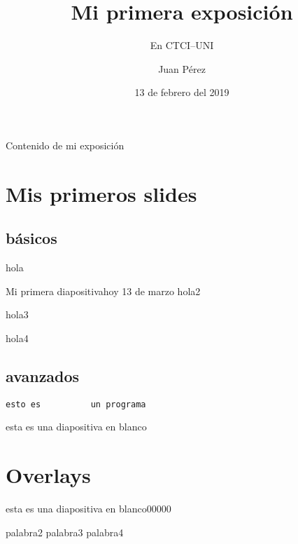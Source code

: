 \documentclass[utf8,spanish,xcolor={svgnames},14pt,handout]{beamer}
\title{Mi primera exposición}
\subtitle{En CTCI--UNI}
\author{Juan Pérez}
\institute[UNI]{UNIVERSIDAD NACIONAL DE INGENIERÍA}
\date{13 de febrero del 2019}
\begin{document}
\maketitle

\begin{frame}{Contenido de mi exposición}\transblindsvertical
\tableofcontents
\end{frame}

\section{Mis primeros slides}
\subsection{básicos}
\begin{frame}\transsplithorizontalout
hola
\end{frame}

\begin{frame}{Mi primera diapositiva}{hoy 13 de marzo}\transsplithorizontalout
hola2
\end{frame}

\begin{frame}[t]
hola3
\end{frame}

\begin{frame}[b]
hola4
\end{frame}

\subsection{avanzados}
\begin{frame}[fragile]\transsplitverticalout
\begin{verbatim}
esto es          un programa
\end{verbatim}
\end{frame}

\begin{frame}[plain]
esta es una diapositiva en blanco

\end{frame}


\section{Overlays}
\begin{frame}\transblindsvertical
esta es una diapositiva en blanco00000
\pause

palabra2 \pause
palabra3 \pause
palabra4

\end{frame}
\end{document}
